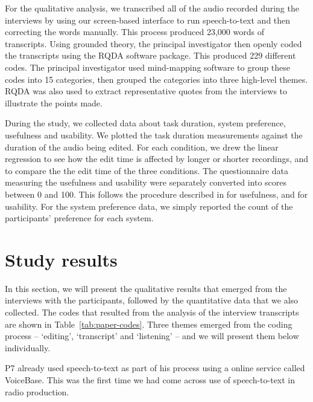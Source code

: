 For the qualitative analysis, we transcribed all of the audio recorded during the interviews by using our screen-based
interface to run speech-to-text and then correcting the words manually. This process produced 23,000 words of
transcripts. Using grounded theory, the principal investigator then openly coded the transcripts using the RQDA
software package. This produced 229 different codes. The principal investigator used mind-mapping software to group
these codes into 15 categories, then grouped the categories into three high-level themes. RQDA was also used to extract
representative quotes from the interviews to illustrate the points made.

During the study, we collected data about task duration, system preference, usefulness and usability.
We plotted the task duration measurements against the duration of the audio being edited. For each condition, we drew
the linear regression to see how the edit time is affected by longer or shorter recordings, and to compare the the edit
time of the three conditions.
The questionnaire data measuring the usefulness and usability were separately converted into scores between 0 and 100.
This follows the procedure described in \citet{Davis1989} for usefulness, and \citet{Brooke1996} for usability.
For the system preference data, we simply reported the count of the participants' preference for each system.

\section{Study results}\label{sec:paper-results}

In this section, we will present the qualitative results that emerged from the interviews with the participants,
followed by the quantitative data that we also collected.  The codes that resulted from the analysis of the interview
transcripts are shown in Table~\ref{tab:paper-codes}. Three themes emerged from the coding process -- `editing',
`transcript' and `listening' -- and we will present them below individually. 

P7 already used speech-to-text as part of his process using a online service called VoiceBase. This was the first time
we had come across use of speech-to-text in radio production.

